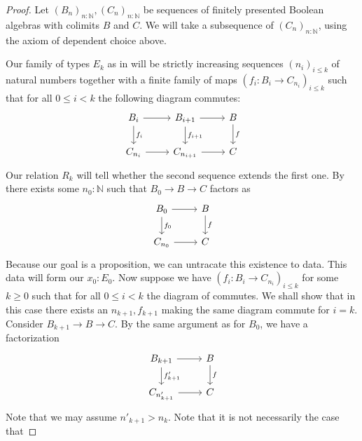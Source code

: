 \begin{proof}
  Let $(B_n)_{n:\mathbb N}, (C_n)_{n:\mathbb N}$ be 
  sequences of finitely presented Boolean algebras with colimits $B$ and $C$. 
  We will take a subsequence of $(C_n)_{n:\mathbb N}$, using the axiom of dependent choice above. 

  Our family of types $E_k$ as in  
  will be strictly increasing sequences $(n_i)_{i\leq k}$ of natural numbers together with a finite family of maps 
  $(f_i: B_{i} \to C_{n_i})_{i\leq k}$ such that
  for all $0\leq i<k$ the following diagram commutes:
  \begin{equation}\label{eqnDecompositionOfColimitMorphisms}
    \begin{tikzcd}
      B_{i} \arrow[r] \arrow[d, "f_i"]& B_{{i+1}} \arrow[r] \arrow[d,"f_{i+1}"]& B \arrow[d,"f"] \\
      C_{n_i} \arrow[r] & C_{n_{i+1}} \arrow[r] & C 
    \end{tikzcd}
  \end{equation}
  Our relation $R_k$ will tell whether the second sequence extends the first one. 
%
  By  
  there exists some $n_0:\mathbb N$ 
  such that $B_0 \to B \to C$ factors as 
  \begin{equation}
    \begin{tikzcd}
      B_{0} \arrow[r] \arrow[d, "f_0"]& B \arrow[d,"f"] \\
      C_{n_0} \arrow[r] & C 
    \end{tikzcd}
  \end{equation}
  Because our goal is a proposition, we can untracate this existence to data. 
  This data will form our $x_0:E_0$. %
%
  Now suppose we have $(f_i: B_{i} \to C_{n_i})_{i\leq k}$ for some $k\geq 0$ 
  such that
  for all $0\leq i<k$ the diagram of  commutes.
  We shall show that in this case there exists an $n_{k+1}, f_{k+1}$ 
  making the same diagram commute for $i = k$. 
  Consider $B_{{k}+1}\to B \to C$. By the same argument as for $B_0$, we have a factorization 
  \begin{equation}
    \begin{tikzcd}
    B_{k+1} \arrow[r]  \arrow[d,"f'_{k+1}"]& B \arrow[d,"f"]\\
    C_{n'_{k+1}} \arrow[r] & C
    \end{tikzcd}
  \end{equation}
  Note that we may assume $n'_{k+1} > n_k$.
  Note that it is not necessarily the case that 

\end{proof}
